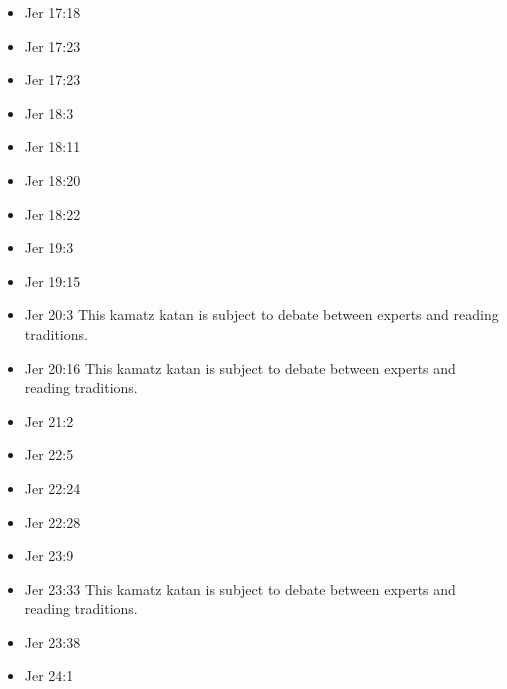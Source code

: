 \documentclass[14pt]{book}
\begin{document}
\begin{multicols}{2}
\begin{itemize}
						\item Jer 17:18
						
						\item Jer 17:23
						
						\item Jer 17:23
						
						\item Jer 18:3
						
						\item Jer 18:11
						
						\item Jer 18:20
						
						\item Jer 18:22
						
						\item Jer 19:3
						
						\item Jer 19:15
						
						\item Jer 20:3 This kamatz katan is subject to debate between experts and reading traditions.
						
						\item Jer 20:16 This kamatz katan is subject to debate between experts and reading traditions.
						
						\item Jer 21:2
						
						\item Jer 22:5
						
						\item Jer 22:24
						
						\item Jer 22:28
						
						\item Jer 23:9
						
						\item Jer 23:33 This kamatz katan is subject to debate between experts and reading traditions.
						
						\item Jer 23:38
						
						\item Jer 24:1
						

\end{itemize}
\end{multicols}
\end{document}
